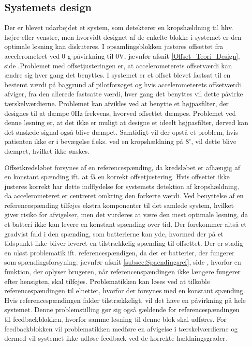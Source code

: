 \subsection{Systemets design}
Der er blevet udarbejdet et system, som detekterer en kropshældning til hhv. højre eller venstre, men hvorvidt designet af de enkelte blokke i systemet er den optimale løsning kan diskuteres. I opsamlingsblokken justeres offsettet fra accelerometret ved $0$ g-påvirkning til $0$V, jævnfør afsnit \ref{Offset_Teori_Design}, side \pageref{Offset_Teori_Design}.Problemet med offsetjusteringen er, at accelerometerets offsetværdi kan ændre sig hver gang det benyttes. I systemet er et offset blevet fastsat til en bestemt værdi på baggrund af pilotforsøget og hvis accelerometerets offsetværdi afviger, fra den allerede fastsatte værdi, hver gang det benyttes vil dette påvirke tærskelværdierne. Problemet kan afvikles ved at benytte et højpasfilter, der designes til at dæmpe $0$Hz frekvens, hvorved offsettet dæmpes. Problemet ved denne løsning er, at det ikke er muligt at designe et ideelt højpasfilter, derved kan det ønskede signal også blive dæmpet. Samtidigt vil der opstå et problem, hvis patienten ikke er i bevægelse f.eks. ved en kropshældning på $8^{\circ}$, vil dette blive dæmpet, hvilket ikke ønskes. 

Offsetkredsløbet forsynes af en referencespænding, da kredsløbet er afhængig af en konstant spænding ift. at få en korrekt offsetjustering.  Hvis offsettet ikke justeres korrekt har dette indflydelse for systemets detektion af kropshældning, da accelerometeret er centreret omkring den forkerte værdi. Ved benyttelse af en referencespænding tilføjes ekstra komponenter til det samlede system, hvilket giver risiko for afvigelser, men det vurderes at være den mest optimale løsning, da et batteri ikke kan levere en konstant spænding over tid. Der forekommer altså et gradvist fald i den spænding, som batterierne kan yde, hvormed der på et tidspunkt ikke bliver leveret en tilstrækkelig spænding til offsettet. Der er stadig en uløst problematik ift. referencespændigen, da det er batterier, der fungerer som spændingsforsyning, jævnfør afsnit \ref{subsec:Spaendingsref}, side \pageref{subsec:Spaendingsref}, hvorfor en funktion, der oplyser brugeren, når referencenspændingen ikke længere fungerer efter hensigten, skal tilføjes. Problematikken kan løses ved at tilkoble referencespændingen til elnettet, hvorfor der forsynes med en konstant spænding. Hvis referencespændingen falder tilstrækkeligt, vil det have en påvirkning på hele systemet. Denne problemstilling gør sig også gældende for referencespændingen til feedbackblokken, hvorfor samme løsning til denne blok skal udføres. For feedbackblokken vil problematikken medføre en afvigelse i tærskelværdierne og dermed vil systemet ikke udløse feedback ved de korrekte hældningsgrader. 

